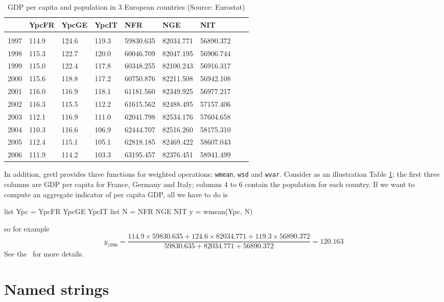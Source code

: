 \begin{table}
  \centering
  \begin{tabular}{lllllllll}
\hline
	& YpcFR & YpcGE	& YpcIT	& NFR		& NGE		& NIT        \\ 
\hline
\\ [-8pt]
1997	& 114.9 & 124.6	& 119.3	& 59830.635	& 82034.771	& 56890.372  \\ 
1998	& 115.3 & 122.7	& 120.0	& 60046.709	& 82047.195	& 56906.744  \\ 
1999	& 115.0	& 122.4	& 117.8	& 60348.255	& 82100.243	& 56916.317  \\ 
2000	& 115.6 & 118.8	& 117.2	& 60750.876	& 82211.508	& 56942.108  \\ 
2001	& 116.0	& 116.9	& 118.1	& 61181.560	& 82349.925	& 56977.217  \\ 
2002	& 116.3 & 115.5	& 112.2	& 61615.562	& 82488.495	& 57157.406  \\ 
2003	& 112.1 & 116.9	& 111.0	& 62041.798	& 82534.176	& 57604.658  \\ 
2004	& 110.3 & 116.6	& 106.9	& 62444.707	& 82516.260	& 58175.310  \\ 
2005	& 112.4 & 115.1	& 105.1	& 62818.185	& 82469.422	& 58607.043  \\ 
2006	& 111.9 & 114.2	& 103.3	& 63195.457	& 82376.451	& 58941.499  \\
\hline
  \end{tabular}
  \caption{GDP per capita and population in 3 European countries (Source: Eurostat)}
  \label{tab:EuroData}
\end{table}
In addition, gretl provides three functions for weighted
operations: \texttt{wmean}, \texttt{wsd} and \texttt{wvar}. Consider
as an illustration Table \ref{tab:EuroData}: the first three columns are GDP
per capita for France, Germany and Italy; columns 4 to 6 contain the
population for each country. If we want to compute an aggregate
indicator of per capita GDP, all we have to do is
\begin{code}
list Ypc = YpcFR YpcGE YpcIT
list N = NFR NGE NIT
y = wmean(Ypc, N)
\end{code}
so for example
\[
y_{1996} = \frac{114.9 \times 59830.635 + 124.6 \times 82034.771 +
  119.3 \times 56890.372} {59830.635 + 82034.771 + 56890.372} =
120.163
\]
See the \GCR\ for more details.

\section{Named strings}
\label{sec:named-strings}

